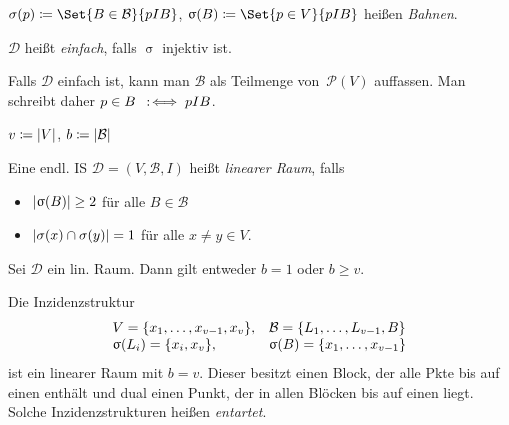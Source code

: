 \documentclass{cheat-sheet}
\newcommand{\Design}{\mathcal{D}} %
\newcommand{\Blocks}{\mathcal{B}} %
\newcommand{\Pow}{\mathcal{P}} %
\begin{document}
\begin{defn}
  $\sigma(p) \coloneqq \Set{B \in \Blocks}{p I B}$,
  $\upsigma(B) \coloneqq \Set{p \in V}{p I B}$
  heißen \emph{Bahnen}.
\end{defn}

\begin{defn}
  $\Design$ heißt \emph{einfach}, falls $\upsigma$ injektiv ist.
\end{defn}

\begin{nota}
  Falls $\Design$ einfach ist, kann man $\Blocks$ als Teilmenge von~$\Pow(V)$ auffassen. Man schreibt daher
  $p \in B \enspace:\!\iff p I B$.
\end{nota}

\begin{nota}
  $v \coloneqq \lvert V\rvert$, \enspace
  $b \coloneqq \abs{\Blocks}$
\end{nota}

\begin{defn}
  Eine endl. IS $\Design = (V, \Blocks, I)$ heißt \emph{linearer Raum}, falls
  \begin{itemize}
    \item $\lvert\upsigma(B)\rvert \geq 2$ für alle $B \in \Blocks$
    \item $\lvert\sigma(x) \cap \sigma(y)\rvert = 1$ für alle $x \neq y \in V$.
  \end{itemize}
\end{defn}


\begin{satz}
  Sei $\Design$ ein lin. Raum.
  Dann gilt entweder $b = 1$ oder $b \geq v$.
\end{satz}


\begin{bsp}
  Die Inzidenzstruktur
  \[
    \begin{array}{l l}
      V = \{ x_1, \ldots, x_{v-1}, x_v \},
      & \Blocks = \{ L_1, \ldots, L_{v-1}, B \} \\
      \upsigma(L_i) = \{ x_i, x_v \},
      & \upsigma(B) = \{ x_1, \ldots, x_{v-1} \}
    \end{array}
  \]
  ist ein linearer Raum mit $b = v$.
  Dieser besitzt einen Block, der alle Pkte bis auf einen enthält und dual einen Punkt, der in allen Blöcken bis auf einen liegt.
  Solche Inzidenzstrukturen heißen \emph{entartet}.
\end{bsp}
\end{document}
